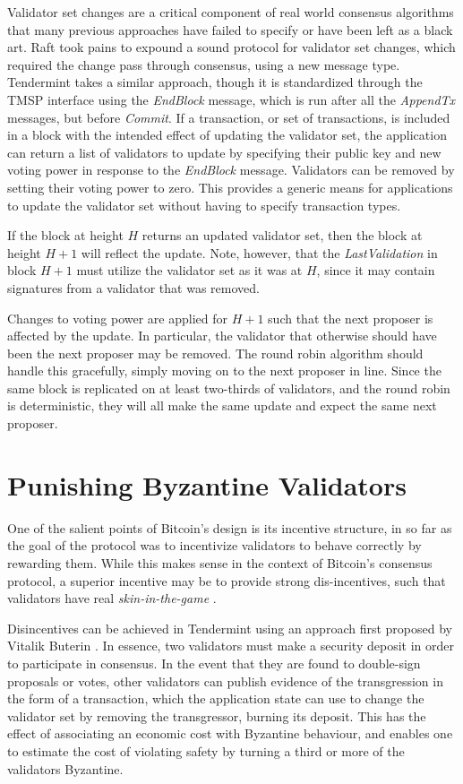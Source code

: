 Validator set changes are a critical component of real world consensus algorithms that many previous approaches have failed to specify 
or have been left as a black art. 
Raft took pains to expound a sound protocol for validator set changes, which required the change pass through consensus, 
using a new message type.
Tendermint takes a similar approach, though it is standardized through the TMSP interface using the \emph{EndBlock} message,
which is run after all the \emph{AppendTx} messages, but before \emph{Commit}.
If a transaction, or set of transactions, is included in a block with the intended effect of updating the validator set,
the application can return a list of validators to update by specifying their public key and new voting power 
in response to the \emph{EndBlock} message.
Validators can be removed by setting their voting power to zero.
This provides a generic means for applications to update the validator set without having to specify transaction types.

If the block at height $H$ returns an updated validator set, 
then the block at height $H+1$ will reflect the update.
Note, however, that the \emph{LastValidation} in block $H+1$
must utilize the validator set as it was at $H$, 
since it may contain signatures from a validator that was removed.

Changes to voting power are applied for $H+1$ such that the next proposer 
is affected by the update. 
In particular, the validator that otherwise should have been the next proposer may be removed.
The round robin algorithm should handle this gracefully, simply moving on to the next proposer in line.
Since the same block is replicated on at least two-thirds of validators, 
and the round robin is deterministic,
they will all make the same update and expect the same next proposer.

\section{Punishing Byzantine Validators}

One of the salient points of Bitcoin's design is its incentive structure, 
in so far as the goal of the protocol was to incentivize validators to behave correctly
by rewarding them. While this makes sense in the context of Bitcoin's consensus protocol,
a superior incentive may be to provide strong dis-incentives, such that validators
have real \emph{skin-in-the-game} \cite{taleb2014skin}.

Disincentives can be achieved in Tendermint using an approach first proposed by Vitalik Buterin \cite{slasher}.
In essence, two validators must make a security deposit in order to participate in consensus.
In the event that they are found to double-sign proposals or votes, 
other validators can publish evidence of the transgression in the form of a transaction, 
which the application state can use to change the validator set by removing the transgressor, burning its deposit.
This has the effect of associating an economic cost with Byzantine behaviour, 
and enables one to estimate the cost of violating safety by turning a third or more of the validators Byzantine.

